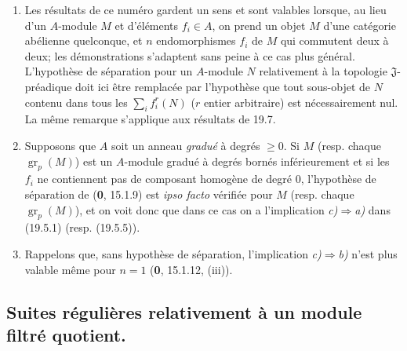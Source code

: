 \begin{remarks}[19.5.6]
\label{IV.19.5.6}
\begin{enumerate}
  \item[(i)] Les résultats de ce numéro gardent un sens et sont valables lorsque, au lieu d'un $A$-module $M$ et d'éléments $f_i\in A$, on prend un objet $M$ d'une catégorie abélienne quelconque, et $n$ endomorphismes $f_i$ de $M$ qui commutent deux à deux; les démonstrations s'adaptent sans peine à ce cas plus général. L'hypothèse de séparation pour un $A$-module $N$ relativement à la topologie $\mathfrak J$-préadique doit ici être remplacée par l'hypothèse que tout sous-objet de $N$ contenu dans tous les $\sum_i f_i^r(N)$ ($r$ entier arbitraire) est nécessairement nul. La même remarque s'applique aux résultats de 19.7.
  \item[(ii)] Supposons que $A$ soit un anneau \emph{gradué} à degrés $\geq0$. Si $M$ (resp. chaque $\operatorname{gr}_p(M)$) est un $A$-module gradué à degrés bornés inférieurement et si les $f_i$ ne contiennent pas de composant homogène de degré $0$, l'hypothèse de séparation de (\textbf{0}, 15.1.9) est \emph{ipso facto} vérifiée pour $M$ (resp. chaque $\operatorname{gr}_p(M)$), et on voit donc que dans ce cas on a l'implication \emph{c)}$\Rightarrow$\emph{a)} dans (19.5.1) (resp. (19.5.5)).
  \item[(iii)] Rappelons que, sans hypothèse de séparation, l'implication \emph{c)}$\Rightarrow$\emph{b)} n'est plus valable même pour $n=1$ (\textbf{0}, 15.1.12, (iii)).
\end{enumerate}
\end{remarks}

\subsection{Suites régulières relativement à un module filtré quotient.}

